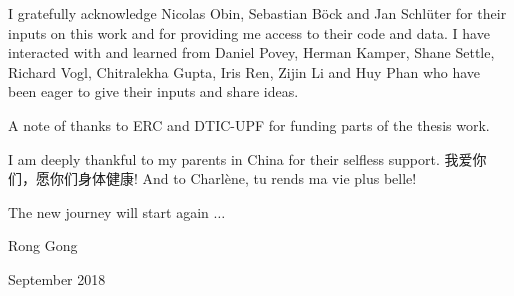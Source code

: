 I gratefully acknowledge Nicolas Obin, Sebastian Böck and Jan Schlüter for their inputs on this work and for providing me access to their code and data.  I have interacted with and learned from Daniel Povey, Herman Kamper, Shane Settle, Richard Vogl, Chitralekha Gupta, Iris Ren, Zijin Li and Huy Phan who have been eager to give their inputs and share ideas. 

A note of thanks to ERC and DTIC-UPF for funding parts of the thesis work.

I am deeply thankful to my parents in China for their selfless support. 我爱你们，愿你们身体健康! And to Charlène, tu rends ma vie plus belle!\par

\vspace{1em}\par
\noindent The new journey will start again $\ldots$ \par
\par \par
\noindent Rong Gong \par
{} September 2018
